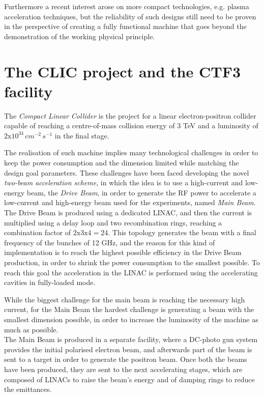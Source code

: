 Furthermore a recent interest arose on more compact technologies, e.g. plasma acceleration techniques, but the reliability of such designs still need to be proven in the perspective of creating a fully functional machine that goes beyond the demonstration of the working physical principle.



\section{The CLIC project and the CTF3 facility}

The \textit{Compact Linear Collider} is the project for a linear electron-positron collider capable of reaching a centre-of-mass collision energy of 3 TeV and a luminosity of $2\text{x}10^{34} \, cm^{-2} \, s^{-1}$ in the final stage.

The realisation of such machine implies many technological challenges in order to keep the power consumption and the dimension limited while matching the design goal parameters. These challenges have been faced developing the novel \textit{two-beam acceleration scheme}, in which the idea is to use a high-current and low-energy beam, the \textit{Drive Beam}, in order to generate the RF power to accelerate a low-current and high-energy beam used for the experiments, named \textit{Main Beam}. \\
The Drive Beam is produced using a dedicated LINAC, and then the current is multiplied using a delay loop and two recombination rings, reaching a combination factor of $2\text{x}3\text{x}4=24$. This topology generates the beam with a final frequency of the bunches of 12 GHz, and the reason for this kind of implementation is to reach the highest possible efficiency in the Drive Beam production, in order to shrink the power consumption to the smallest possible. To reach this goal the acceleration in the LINAC is performed using the accelerating cavities in fully-loaded mode. 

While the biggest challenge for the main beam is reaching the necessary high current, for the Main Beam the hardest challenge is generating a beam with the smallest dimension possible, in order to increase the luminosity of the machine as much as possible.\\
The Main Beam is produced in a separate facility, where a DC-photo gun system provides the initial polarised electron beam, and afterwards part of the beam is sent to a target in order to generate the positron beam. Once both the beams have been produced, they are sent to the next accelerating stages, which are composed of LINACs to raise the beam's energy and of damping rings to reduce the emittances. 

